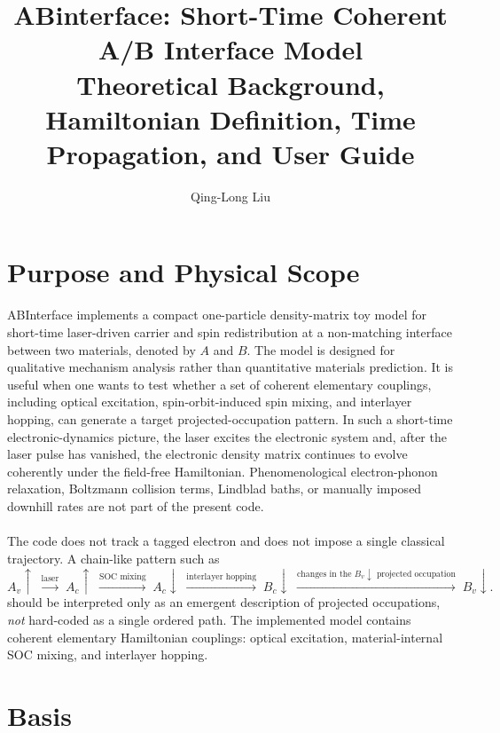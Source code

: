 \documentclass[11pt,a4paper]{article}
\title{\LARGE{\textbf{ABinterface: Short-Time Coherent A/B Interface Model}}\\
\vspace{1.0cm}
\normalsize Theoretical Background, Hamiltonian Definition, Time Propagation, and User Guide}
\author{Qing-Long Liu}
\date{}
\begin{document}
\maketitle

\tableofcontents
\newpage

\section{Purpose and Physical Scope}

ABInterface implements a compact one-particle density-matrix toy model for short-time laser-driven
carrier and spin redistribution at a non-matching interface between two materials, 
denoted by $A$ and $B$.  The model is designed for qualitative mechanism analysis 
rather than quantitative materials prediction.  It is useful when one wants to test 
whether a set of coherent elementary couplings, including optical excitation,
spin-orbit-induced spin mixing, and interlayer hopping, can generate a target
projected-occupation pattern.
In such a short-time electronic-dynamics picture, 
the laser excites the electronic system and, after the laser pulse has vanished, 
the electronic density matrix continues to evolve coherently under the field-free Hamiltonian.  
Phenomenological electron-phonon relaxation, Boltzmann collision terms, 
Lindblad baths, or manually imposed downhill rates are not part of the present code.
\\
\\
The code does not track a tagged electron and does not impose a single classical trajectory.  
A chain-like pattern such as
\begin{equation}
A_v\uparrow
\;\xrightarrow{\text{laser}}\;
A_c\uparrow
\;\xrightarrow{\text{SOC mixing}}\;
A_c\downarrow
\;\xrightarrow{\text{interlayer hopping}}\;
B_c\downarrow
\;\xrightarrow{\text{changes in the }B_v\downarrow\text{ projected occupation}}\;
B_v\downarrow.
\end{equation}
should be interpreted only as an emergent description of projected occupations, 
\emph{not} hard-coded as a single ordered path.  
The implemented model contains coherent elementary Hamiltonian couplings: 
optical excitation, material-internal SOC mixing, and interlayer hopping.

\section{Basis}
\end{document}
